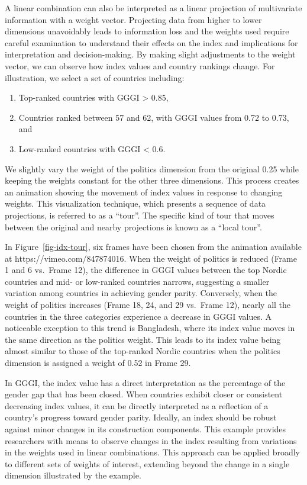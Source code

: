 \documentclass[
]{interact}
\providecommand{\tightlist}{%
  \setlength{\itemsep}{0pt}\setlength{\parskip}{0pt}}\usepackage{longtable,booktabs,array}
\begin{document}
A linear combination can also be interpreted as a linear projection of
multivariate information with a weight vector. Projecting data from
higher to lower dimensions unavoidably leads to information loss and the
weights used require careful examination to understand their effects on
the index and implications for interpretation and decision-making. By
making slight adjustments to the weight vector, we can observe how index
values and country rankings change. For illustration, we select a set of
countries including:

\begin{enumerate}
\def\labelenumi{\arabic{enumi})}
\tightlist
\item
  Top-ranked countries with GGGI \textgreater{} 0.85,
\item
  Countries ranked between 57 and 62, with GGGI values from 0.72 to
  0.73, and
\item
  Low-ranked countries with GGGI \textless{} 0.6.
\end{enumerate}

We slightly vary the weight of the politics dimension from the original
0.25 while keeping the weights constant for the other three dimensions.
This process creates an animation showing the movement of index values
in response to changing weights. This visualization technique, which
presents a sequence of data projections, is referred to as a ``tour''.
The specific kind of tour that moves between the original and nearby
projections is known as a ``local tour''.

In Figure~\ref{fig-idx-tour}, six frames have been chosen from the
animation available at https://vimeo.com/847874016. When the weight of
politics is reduced (Frame 1 and 6 vs.~Frame 12), the difference in GGGI
values between the top Nordic countries and mid- or low-ranked countries
narrows, suggesting a smaller variation among countries in achieving
gender parity. Conversely, when the weight of politics increases (Frame
18, 24, and 29 vs.~Frame 12), nearly all the countries in the three
categories experience a decrease in GGGI values. A noticeable exception
to this trend is Bangladesh, where its index value moves in the same
direction as the politics weight. This leads to its index value being
almost similar to those of the top-ranked Nordic countries when the
politics dimension is assigned a weight of 0.52 in Frame 29.

In GGGI, the index value has a direct interpretation as the percentage
of the gender gap that has been closed. When countries exhibit closer or
consistent decreasing index values, it can be directly interpreted as a
reflection of a country's progress toward gender parity. Ideally, an
index should be robust against minor changes in its construction
components. This example provides researchers with means to observe
changes in the index resulting from variations in the weights used in
linear combinations. This approach can be applied broadly to different
sets of weights of interest, extending beyond the change in a single
dimension illustrated by the example.
\end{document}
